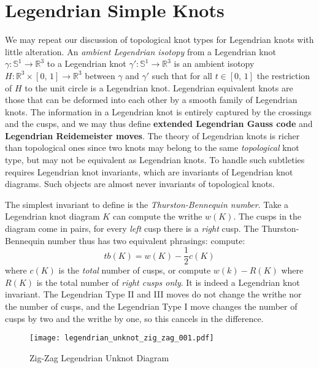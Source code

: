 \section{Legendrian Simple Knots}
    We may repeat our discussion of topological knot types for Legendrian
    knots with little alteration. An \textit{ambient Legendrian isotopy} from
    a Legendrian knot $\gamma:\mathbb{S}^{1}\rightarrow\mathbb{R}^{3}$ to a
    Legendrian knot $\gamma':\mathbb{S}^{1}\rightarrow\mathbb{R}^{3}$ is an
    ambient isotopy $H:\mathbb{R}^{3}\times[0,\,1]\rightarrow\mathbb{R}^{3}$
    between $\gamma$ and $\gamma'$ such that for all $t\in[0,\,1]$ the
    restriction of $H$ to the unit circle is a Legendrian knot. Legendrian
    equivalent knots are those that can be deformed into each other by a
    smooth family of Legendrian knots. The information in a Legendrian knot is
    entirely captured by the crossings and the cusps, and we may thus define
    \textbf{extended Legendrian Gauss code} and
    \textbf{Legendrian Reidemeister moves}. The theory of Legendrian knots is
    richer than topological ones since two knots may belong to the same
    \textit{topological} knot type, but may not be equivalent as Legendrian
    knots. To handle such subtleties requires Legendrian knot invariants, which
    are invariants of Legendrian knot diagrams. Such objects are almost never
    invariants of topological knots.
    \par\hfill\par
    The simplest invariant to define is the \textit{Thurston-Bennequin number}.
    Take a Legendrian knot diagram $K$ can compute the writhe $w(K)$. The
    cusps in the diagram come in pairs, for every \textit{left} cusp there is
    a \textit{right} cusp. The Thurston-Bennequin number thus has two
    equivalent phrasings: compute:
    \begin{equation}
        tb(K)=w(K)-\frac{1}{2}c(K)
    \end{equation}
    where $c(K)$ is the \textit{total} number of cusps, or compute
    $w(k)-R(K)$ where $R(K)$ is the total number of \textit{right cusps only}.
    It is indeed a Legendrian knot invariant. The Legendrian Type II and III
    moves do not change the writhe nor the number of cusps, and the Legendrian
    Type I move changes the number of cusps by two and the writhe by one, so
    this cancels in the difference.
    \par\hfill\par
    \begin{figure}
        \centering
        \texttt{[image: legendrian\_unknot\_zig\_zag\_001.pdf]}
        \caption{Zig-Zag Legendrian Unknot Diagram}
        \label{fig:legendrian_unknot_zig_zag_001}
    \end{figure}

